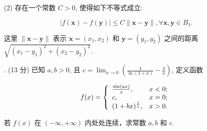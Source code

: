 \documentclass{examcollection}
\renewcommand{\displayformula}[1]{\[#1\]}
\begin{document}
{\begin{minipage}{\textwidth}
(2) 存在一个常数 $C > 0$, 使得如下不等式成立:\par
\displayformula{| f (\boldsymbol {x}) - f (\boldsymbol {y}) | \leq C \| \boldsymbol {x} - \boldsymbol {y} \|, \forall \boldsymbol {x}, \boldsymbol {y} \in B _ {1}.}\par
这里 $\| \pmb {x} - \pmb{y}\|$ 表示 $\pmb {x} = (x_1,x_2)$ 和 $\pmb {y} = (y_{1},y_{2})$ 之间的距离 $\sqrt{(x_1 - y_1)^2 + (x_2 - y_2)^2}.$\par
{}. (13 分) 已知 $a, b > 0$, 且 $c = \lim_{x \to 0} \left( \frac{4}{\ln(1 + x)} - \frac{4}{x} \right)$, 定义函数\par
\displayformula{f (x) = \left\{ \begin{array}{l l} \frac {\sin (a x)}{x}, & x <   0; \\ c, & x = 0; \\ (1 + b x) ^ {\frac {1}{a}}, & x > 0. \end{array} \right.}\par
若 $f(x)$ 在 $(-\infty, +\infty)$ 内处处连续，求常数 $a, b$ 和 $c$.\par
\end{minipage}}
\ifdim\dimexpr\ht\proofbox+\dp\proofbox\relax>\textheight
\noindent\resizebox{!}{\textheight}{\usebox{\proofbox}}\else\noindent\usebox{\proofbox}\fi\clearpage
\end{document}
